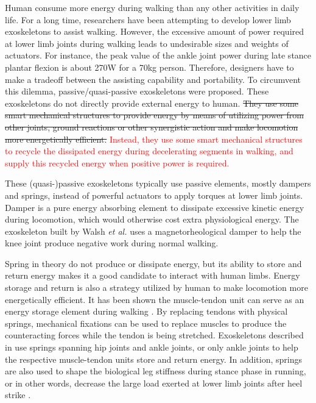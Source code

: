 \documentclass[twocolumn,cleanfoot,10pt]{asme2ej}
\begin{document}
Human consume more energy during walking than any other activities in daily life.
For a long time, researchers have been attempting to develop lower limb exoskeletons to assist walking.
However, the excessive amount of power required at lower limb joints during walking leads to undesirable sizes and weights of actuators\cite{RN1}.
For instance, the peak value of the ankle joint power during late stance plantar flexion is about 270W for a 70kg person\cite{RN2}.
Therefore, designers have to make a tradeoff between the assisting capability and portability.
To circumvent this dilemma, passive/quasi-passive exoskeletons were proposed\cite{RN3}.
These exoskeletons do not directly provide external energy to human.
\sout{They use some smart mechanical structures to provide energy by means of utilizing power from other joints, ground reactions or other synergistic action and make locomotion more energetically efficient.}
\textcolor{red}{Instead, they use some smart mechanical structures to recycle the dissipated energy during decelerating segments in walking, and supply this recycled energy when positive power is required.}

These (quasi-)passive exoskeletons typically use passive elements, mostly dampers and springs, instead of powerful actuators to apply torques at lower limb joints.
Damper is a pure energy absorbing element to dissipate excessive kinetic energy during locomotion, which would otherwise cost extra physiological energy\cite{negativework}.
The exoskeleton built by Walsh \emph{et al.} uses a magnetorheological damper to help the knee joint produce negative work during normal walking\cite{RN3}.

Spring in theory do not produce or dissipate energy, but its ability to store and return energy makes it a good candidate to interact with human limbs. 
Energy storage and return is also a strategy utilized by human to make locomotion more energetically efficient.
It has been shown the muscle-tendon unit can serve as an energy storage element during walking \cite{RN16,pays}.
By replacing tendons with physical springs, mechanical fixations can be used to replace muscles to produce the counteracting forces while the tendon is being stretched.
Exoskeletons described in \cite{RN3,RN4,RN5} use springs spanning hip joints and ankle joints, or only ankle joints to help the respective muscle-tendon units store and return energy.
In addition, springs are also used to shape the biological leg stiffness during stance phase in running, or in other words, decrease the large load exerted at lower limb joints after heel strike \cite{RN6,RN7,RN8}.
\end{document}
